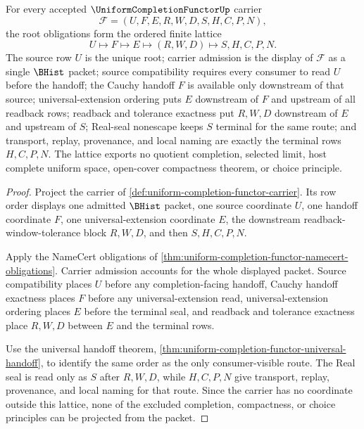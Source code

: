 \begin{theorem}
\label{thm:uniform-completion-functor-root-obligation-lattice}
For every accepted $\UniformCompletionFunctorUp$ carrier
$$
\mathcal{F}=(U,F,E,R,W,D,S,H,C,P,N),
$$
the root obligations form the ordered finite lattice
$$
U \longmapsto F \longmapsto E \longmapsto (R,W,D) \longmapsto S,H,C,P,N .
$$
The source row $U$ is the unique root; carrier admission is the display of $\mathcal{F}$ as a single $\BHist$ packet; source compatibility requires every consumer to read $U$ before the handoff; the Cauchy handoff $F$ is available only downstream of that source; universal-extension ordering puts $E$ downstream of $F$ and upstream of all readback rows; readback and tolerance exactness put $R,W,D$ downstream of $E$ and upstream of $S$; Real-seal nonescape keeps $S$ terminal for the same route; and transport, replay, provenance, and local naming are exactly the terminal rows $H,C,P,N$. The lattice exports no quotient completion, selected limit, host complete uniform space, open-cover compactness theorem, or choice principle.
\end{theorem}
\begin{proof}
Project the carrier of \autoref{def:uniform-completion-functor-carrier}. Its row order displays one admitted $\BHist$ packet, one source coordinate $U$, one handoff coordinate $F$, one universal-extension coordinate $E$, the downstream readback-window-tolerance block $R,W,D$, and then $S,H,C,P,N$.

Apply the NameCert obligations of \autoref{thm:uniform-completion-functor-namecert-obligations}. Carrier admission accounts for the whole displayed packet. Source compatibility places $U$ before any completion-facing handoff, Cauchy handoff exactness places $F$ before any universal-extension read, universal-extension ordering places $E$ before the terminal seal, and readback and tolerance exactness place $R,W,D$ between $E$ and the terminal rows.

Use the universal handoff theorem, \autoref{thm:uniform-completion-functor-universal-handoff}, to identify the same order as the only consumer-visible route. The Real seal is read only as $S$ after $R,W,D$, while $H,C,P,N$ give transport, replay, provenance, and local naming for that route. Since the carrier has no coordinate outside this lattice, none of the excluded completion, compactness, or choice principles can be projected from the packet.
\end{proof}

